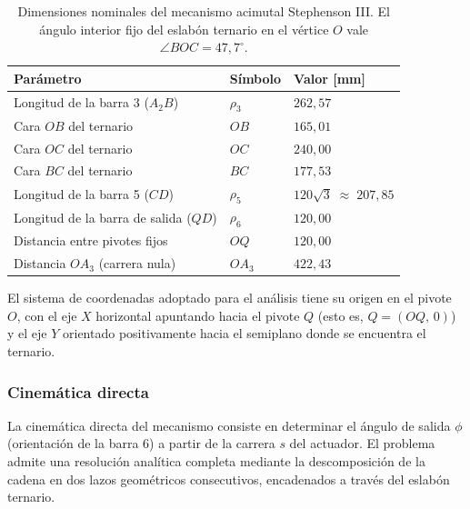 \begin{table}[H]
    \centering
    \begin{tabular}{lll}
        \toprule
        \textbf{Parámetro} & \textbf{Símbolo} & \textbf{Valor [mm]} \\
        \midrule
        Longitud de la barra 3 ($A_2 B$)       & $\rho_3$  & $262{,}57$ \\
        Cara $OB$ del ternario                 & $OB$      & $165{,}01$ \\
        Cara $OC$ del ternario                 & $OC$      & $240{,}00$ \\
        Cara $BC$ del ternario                 & $BC$      & $177{,}53$ \\
        Longitud de la barra 5 ($CD$)          & $\rho_5$  & $120\sqrt{3}\;\approx\;207{,}85$ \\
        Longitud de la barra de salida ($QD$)  & $\rho_6$  & $120{,}00$ \\
        Distancia entre pivotes fijos          & $OQ$      & $120{,}00$ \\
        Distancia $OA_3$ (carrera nula)        & $OA_{3}$  & $422{,}43$ \\
        \bottomrule
    \end{tabular}
    \caption{Dimensiones nominales del mecanismo acimutal Stephenson III. El ángulo interior 
    fijo del eslabón ternario en el vértice $O$ vale $\angle BOC = 47{,}7^{\circ}$.}
    \label{tab:dim_stephenson}
\end{table}

El sistema de coordenadas adoptado para el análisis tiene su origen en el pivote $O$, con el eje $X$ horizontal apuntando hacia el pivote $Q$ (esto es, $Q=(OQ,\,0)$) y el eje $Y$ orientado positivamente hacia el semiplano donde se encuentra el ternario.

\subsubsection{Cinemática directa}
\label{sec:cinematica_acimut}
La cinemática directa del mecanismo consiste en determinar el ángulo de salida $\phi$ (orientación de la barra 6) a partir de la carrera $s$ del actuador. El problema admite una resolución analítica completa mediante la descomposición de la cadena en dos lazos geométricos consecutivos, encadenados a través del eslabón ternario.

